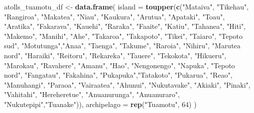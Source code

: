 \documentclass[
]{article}
\newenvironment{Shaded}{\begin{snugshade}}{\end{snugshade}}
\newcommand{\AttributeTok}[1]{\textcolor[rgb]{0.13,0.29,0.53}{#1}}
\newcommand{\DecValTok}[1]{\textcolor[rgb]{0.00,0.00,0.81}{#1}}
\newcommand{\FunctionTok}[1]{\textcolor[rgb]{0.13,0.29,0.53}{\textbf{#1}}}
\newcommand{\NormalTok}[1]{#1}
\newcommand{\OtherTok}[1]{\textcolor[rgb]{0.56,0.35,0.01}{#1}}
\newcommand{\StringTok}[1]{\textcolor[rgb]{0.31,0.60,0.02}{#1}}
\begin{document}
\begin{Shaded}
\begin{Highlighting}[]
\NormalTok{atolls\_tuamotu\_df }\OtherTok{\textless{}{-}} \FunctionTok{data.frame}\NormalTok{(}
  \AttributeTok{island =} \FunctionTok{toupper}\NormalTok{(}\FunctionTok{c}\NormalTok{(}\StringTok{"Mataiva"}\NormalTok{, }\StringTok{"Tikehau"}\NormalTok{, }\StringTok{"Rangiroa"}\NormalTok{, }\StringTok{"Makatea"}\NormalTok{, }\StringTok{"Niau"}\NormalTok{, }\StringTok{"Kaukura"}\NormalTok{, }
                  \StringTok{"Arutua"}\NormalTok{, }\StringTok{"Apataki"}\NormalTok{, }\StringTok{"Toau"}\NormalTok{, }\StringTok{"Aratika"}\NormalTok{, }\StringTok{"Fakarava"}\NormalTok{, }\StringTok{"Kauehi"}\NormalTok{, }
                  \StringTok{"Raraka"}\NormalTok{, }\StringTok{"Faaite"}\NormalTok{, }\StringTok{"Katiu"}\NormalTok{, }\StringTok{"Tahanea"}\NormalTok{, }\StringTok{"Hiti"}\NormalTok{, }\StringTok{"Makemo"}\NormalTok{, }
                  \StringTok{"Manihi"}\NormalTok{, }\StringTok{"Ahe"}\NormalTok{, }\StringTok{"Takaroa"}\NormalTok{, }\StringTok{"Takapoto"}\NormalTok{, }\StringTok{"Tikei"}\NormalTok{, }\StringTok{"Taiaro"}\NormalTok{, }
                  \StringTok{"Tepoto sud"}\NormalTok{, }\StringTok{"Motutunga"}\NormalTok{,}\StringTok{"Anaa"}\NormalTok{, }\StringTok{"Taenga"}\NormalTok{, }\StringTok{"Takume"}\NormalTok{, }\StringTok{"Raroia"}\NormalTok{, }
                  \StringTok{"Nihiru"}\NormalTok{, }\StringTok{"Marutea nord"}\NormalTok{, }\StringTok{"Haraiki"}\NormalTok{, }\StringTok{"Reitoru"}\NormalTok{, }\StringTok{"Rekareka"}\NormalTok{, }
                  \StringTok{"Tauere"}\NormalTok{, }\StringTok{"Tekokota"}\NormalTok{, }\StringTok{"Hikueru"}\NormalTok{, }\StringTok{"Marokau"}\NormalTok{, }\StringTok{"Ravahere"}\NormalTok{, }
                  \StringTok{"Amanu"}\NormalTok{, }\StringTok{"Hao"}\NormalTok{, }\StringTok{"Nengonengo"}\NormalTok{, }\StringTok{"Napuka"}\NormalTok{, }\StringTok{"Tepoto nord"}\NormalTok{, }
                  \StringTok{"Fangatau"}\NormalTok{, }\StringTok{"Fakahina"}\NormalTok{, }\StringTok{"Pukapuka"}\NormalTok{,}\StringTok{"Tatakoto"}\NormalTok{, }\StringTok{"Pukarua"}\NormalTok{, }
                  \StringTok{"Reao"}\NormalTok{, }\StringTok{"Manuhangi"}\NormalTok{, }\StringTok{"Paraoa"}\NormalTok{, }\StringTok{"Vairaatea"}\NormalTok{, }\StringTok{"Ahunui"}\NormalTok{, }
                  \StringTok{"Nukutavake"}\NormalTok{, }\StringTok{"Akiaki"}\NormalTok{, }\StringTok{"Pinaki"}\NormalTok{, }\StringTok{"Vahitahi"}\NormalTok{, }\StringTok{"Hereheretue"}\NormalTok{,}
                  \StringTok{"Anuanurunga"}\NormalTok{, }\StringTok{"Anuanuraro"}\NormalTok{, }\StringTok{"Nukutepipi"}\NormalTok{,}\StringTok{"Tuanake"}\NormalTok{)),}
  \AttributeTok{archipelago =} \FunctionTok{rep}\NormalTok{(}\StringTok{"Tuamotu"}\NormalTok{, }\DecValTok{64}\NormalTok{)}
\NormalTok{)}


\end{Highlighting}
\end{Shaded}
\end{document}
